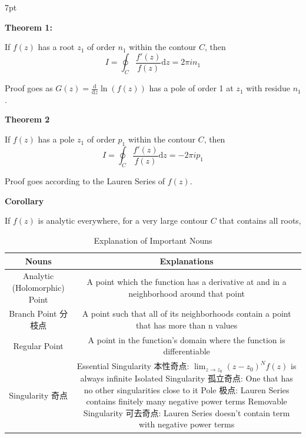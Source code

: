 \documentclass[10pt]{article}
\newcommand{\dd}{\mathrm{d}}
\newenvironment{formal}[2]{%
	\def\FrameCommand{%
		\hspace{1pt}%
		{\color{#1}\vrule width 2pt}%
		{\color{#2}\vrule width 4pt}%
		\colorbox{#2}%
	}%
	\MakeFramed{\advance\hsize-\width\FrameRestore}%
	\noindent\hspace{-4.55pt}%
	\begin{adjustwidth}{}{7pt}%
		\vspace{2pt}\vspace{2pt}%
	}
	{%
		\vspace{2pt}\end{adjustwidth}\endMakeFramed%
}
\begin{document}
\begin{formal}{Blue}{blueshade}

	\textbf{Theorem 1:}
	
	If $f(z)$ has a root $z_1$ of order $n_1$ within the contour $C$, then
	\[
	I = \oint_C \frac{f'(z)}{f(z)} \dd z = 2\pi i n_1
	\]

	Proof goes as $G(z) = \frac{\dd}{\dd z} \ln(f(z))$ has a pole of order 1 at $z_1$ with residue $n_1$.

	\noindent \textbf{Theorem 2}

	If $f(z)$ has a pole $z_1$ of order $p_1$ within the contour $C$, then
	\[
	I = \oint_C \frac{f'(z)}{f(z)} \dd z = -2\pi i p_1
	\]

	Proof goes according to the Lauren Series of $f(z)$.

	\noindent \textbf{Corollary}

	If $f(z)$ is analytic everywhere, for a very large contour $C$ that contains all roots,


\end{formal}







\newpage

\begin{table}[H]
	\centering
	\begin{tabular}{|c|c|}
		\hline
		Nouns & Explanations \\
		\hline
		Analytic (Holomorphic) Point & A point which the function has a derivative at and in a neighborhood around that point \\
		
		Branch Point 分枝点& A point such that all of its neighborhoods contain a point that has more than n values \\
		
		Regular Point & A point in the function's domain where the function is differentiable \\
		
		Singularity 奇点& \thead{Essential Singularity 本性奇点: $\lim_{z\to z_0} (z-z_0)^N f(z)$ is always infinite \\ Isolated Singularity 孤立奇点: One that has no other singularities close to it \\ Pole 极点: Lauren Series contains finitely many negative power terms \\ Removable Singularity 可去奇点: Lauren Series doesn't contain term with negative power terms} \\

		\hline
	\end{tabular}
\caption{Explanation of Important Nouns}
\end{table}
\end{document}
